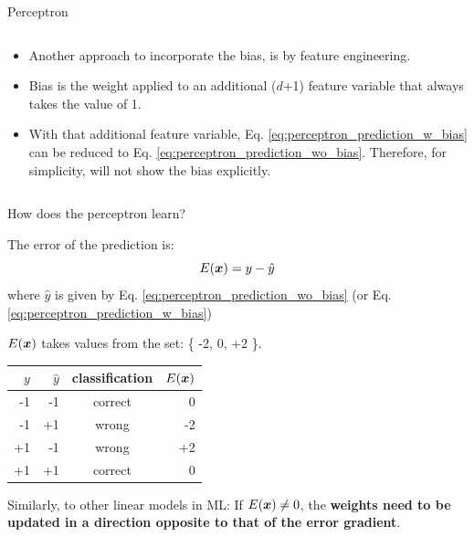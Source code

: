 \begin{frame}[t]{Perceptron}
\begin{columns}
\begin{column}{0.50\textwidth}
\begin{itemize}
                \small
                \item Another approach to incorporate the bias, 
                is by \gls{feature engineering}.
                \item Bias is the weight applied to an additional ($d$+1) 
                feature variable that always takes the value of 1.
                \item With that additional feature variable, 
                Eq. \ref{eq:perceptron_prediction_w_bias}
                can be reduced to Eq. \ref{eq:perceptron_prediction_wo_bias}.
                Therefore, for simplicity, will not show the bias explicitly.
            \end{itemize}        
        \end{column}
      \end{columns}

\end{frame}

%
%
%

\begin{frame}[t]{How does the perceptron learn?}

    The error of the prediction is:
    \begin{equation}
        E(\boldsymbol{x}) = y - \hat{y}
        \label{eq:perceptron_prediction_error}
    \end{equation}        
    where $\hat{y}$ is given by Eq. \ref{eq:perceptron_prediction_wo_bias} 
    (or Eq. \ref{eq:perceptron_prediction_w_bias})\\
    \vspace{0.5cm}

    $E(\boldsymbol{x})$ takes values from the set: \{ -2, 0, +2 \}.\\
    \begin{center}
        \begin{tabular}{rrcr}
            \hline
            $y$  & $\hat{y}$ & classification & $E(\boldsymbol{x})$ \\
            \hline
            -1   & -1  &   correct &   0  \\
            -1   & +1  &   wrong   &  -2  \\
            +1   & -1  &   wrong   &  +2  \\
            +1   & +1  &   correct &   0  \\
            \hline
    \end{tabular}
    \end{center}

    Similarly, to other linear models in ML:
    If $E(\boldsymbol{x}) \ne 0$, the {\bf weights need to be updated in a 
    direction opposite to that of the error gradient}. 

\end{frame}

